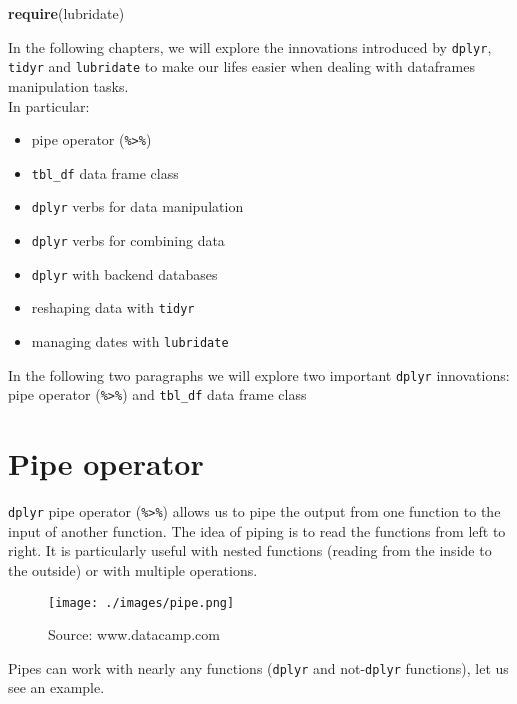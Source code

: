 \documentclass[]{book}
\newenvironment{Shaded}{\begin{snugshade}}{\end{snugshade}}
\newcommand{\KeywordTok}[1]{\textcolor[rgb]{0.13,0.29,0.53}{\textbf{{#1}}}}
\newcommand{\NormalTok}[1]{{#1}}
\providecommand{\tightlist}{%
  \setlength{\itemsep}{0pt}\setlength{\parskip}{0pt}}
\def\tightlist{}
\begin{document}
\begin{Shaded}
\begin{Highlighting}[]
\KeywordTok{require}\NormalTok{(lubridate)}
\end{Highlighting}
\end{Shaded}

In the following chapters, we will explore the innovations introduced by
\texttt{dplyr}, \texttt{tidyr} and \texttt{lubridate} to make our lifes
easier when dealing with dataframes manipulation tasks.\\
In particular:

\begin{itemize}
\tightlist
\item
  pipe operator (\texttt{\%\textgreater{}\%})
\item
  \texttt{tbl\_df} data frame class
\item
  \texttt{dplyr} verbs for data manipulation
\item
  \texttt{dplyr} verbs for combining data
\item
  \texttt{dplyr} with backend databases
\item
  reshaping data with \texttt{tidyr}
\item
  managing dates with \texttt{lubridate}
\end{itemize}

In the following two paragraphs we will explore two important
\texttt{dplyr} innovations: pipe operator (\texttt{\%\textgreater{}\%})
and \texttt{tbl\_df} data frame class

\section{Pipe operator}\label{pipe-operator}

\texttt{dplyr} pipe operator (\texttt{\%\textgreater{}\%}) allows us to
pipe the output from one function to the input of another function. The
idea of piping is to read the functions from left to right. It is
particularly useful with nested functions (reading from the inside to
the outside) or with multiple operations.

\begin{figure}[htbp]
\centering
\texttt{[image: ./images/pipe.png]}
\caption{Source: www.datacamp.com}
\end{figure}

Pipes can work with nearly any functions (\texttt{dplyr} and
not-\texttt{dplyr} functions), let us see an example.
\end{document}

